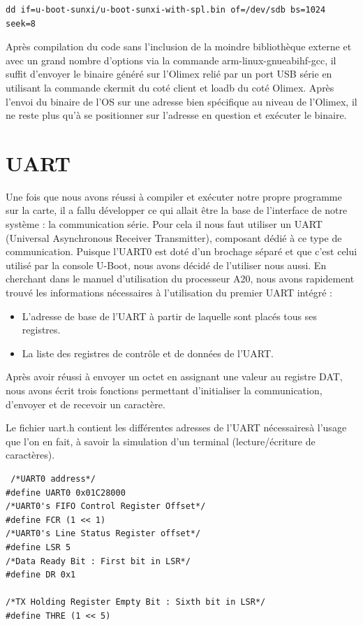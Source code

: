 \documentclass[frenchb]{article}
\begin{document}
\begin{verbatim}
dd if=u-boot-sunxi/u-boot-sunxi-with-spl.bin of=/dev/sdb bs=1024 seek=8
\end{verbatim}

Après compilation du code sans l'inclusion de la moindre bibliothèque externe et avec un grand nombre d'options via la commande \textsf{arm-linux-gnueabihf-gcc}, il suffit d'envoyer le binaire généré sur l'Olimex relié par un port USB série en utilisant la commande ckermit du coté client et loadb du coté Olimex.
Après l'envoi du binaire de l'OS sur une adresse bien spécifique au niveau de l'Olimex, il ne reste plus qu'à se positionner sur l'adresse en question et exécuter le binaire.

\section{UART}
Une fois que nous avons réussi à compiler et exécuter notre propre programme sur la carte, il a fallu développer ce qui allait être la base de l'interface de notre système : la communication série.
Pour cela il nous faut utiliser un UART (Universal Asynchronous Receiver Transmitter), composant dédié à ce type de communication.
Puisque l'UART0 est doté d'un brochage séparé et que c'est celui utilisé par la console U-Boot, nous avons décidé de l'utiliser nous aussi.
En cherchant dans le manuel d'utilisation du processeur A20, nous avons rapidement trouvé les informations nécessaires à l'utilisation du premier UART intégré :
\begin{itemize}
\item L'adresse de base de l'UART à partir de laquelle sont placés tous ses registres.
\item La liste des registres de contrôle et de données de l'UART.
\end{itemize}
Après avoir réussi à envoyer un octet en assignant une valeur au registre DAT, nous avons écrit trois fonctions permettant d'initialiser la communication, d'envoyer et de recevoir un caractère.

Le fichier \textsf{uart.h} contient les différentes adresses de l'UART nécessairesà l'usage que l'on en fait, à savoir la simulation d'un terminal (lecture/écriture de caractères).

\begin{lstlisting}
 /*UART0 address*/
#define UART0 0x01C28000
/*UART0's FIFO Control Register Offset*/
#define FCR (1 << 1)
/*UART0's Line Status Register offset*/
#define LSR 5
/*Data Ready Bit : First bit in LSR*/
#define DR 0x1

/*TX Holding Register Empty Bit : Sixth bit in LSR*/
#define THRE (1 << 5)
\end{lstlisting}
\vspace*{-0.8cm}
\end{document}
